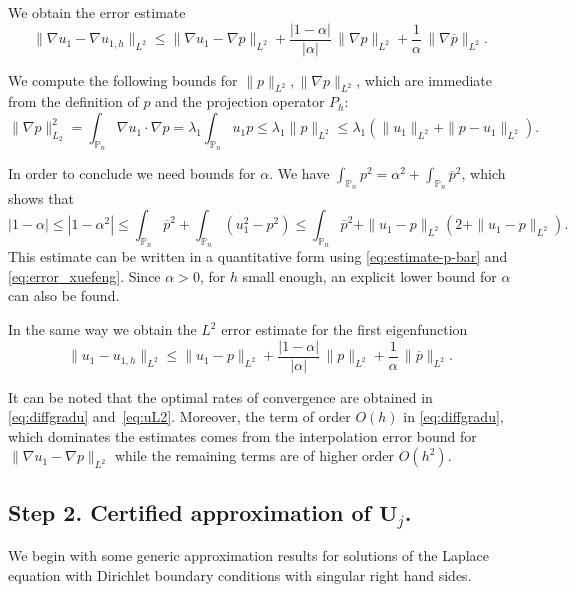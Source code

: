 \documentclass[11pt]{article}
\numberwithin{equation}{section}\newtheorem*{jepEnonce}{\jepEnonceTitle}\newenvironment{enonce*}[1]{\def\jepEnonceTitle{#1}\jepEnonce}{\endjepEnonce}\newtheorem*{conj*}{Conjecture}
\theoremstyle{plain}
\theoremstyle{definition}
\newcommand{\bo}[1]{{\boldsymbol#1}}
\def\Pp{{\mathbb{P}_n}}
\begin{document}
We obtain the error estimate
\begin{equation}
\|\nabla u_1- \nabla u_{1,h}\|_{L^2} \le \|\nabla u_1-\nabla p\|_{L^2} + \frac{|1-\alpha|}{|\alpha |}\, \|\nabla p\|_{L^2} + \frac{1}{\alpha }\, \|\nabla \overline p \|_{L^2}.
\label{eq:diffgradu}
\end{equation}

We compute the following bounds for $\|p\|_{L^2}, \|\nabla p\|_{L^2}$, which are immediate from the definition of $p$ and the projection operator $P_h$:
\[
\| \nabla p\|_{L_2}^2 = \int_\Pp \nabla u_1 \cdot \nabla p = \lambda_1 \int_\Pp u_1p \leq \lambda_1 \|p\|_{L^2}\leq \lambda_1 (\|u_1\|_{L^2}+\|p-u_1\|_{L^2}).
\]

In order to conclude we need bounds for $\alpha$. We have $\int_\Pp p^2=\alpha^2 + \int_\Pp \overline p^2$, which shows that
\[
|1-\alpha| \leq |1-\alpha^2| \leq \int_\Pp \overline p^2 +\int_\Pp (u_1^2-p^2) \leq \int_\Pp \overline p^2 + \|u_1-p\|_{L^2}(2+\|u_1-p\|_{L^2}).
\]
This estimate can be written in a quantitative form using \eqref{eq:estimate-p-bar} and \eqref{eq:error_xuefeng}. Since $\alpha>0$, for $h$ small enough, an explicit lower bound for $\alpha$ can also be found.

In the same way we obtain the $L^2$ error estimate for the first eigenfunction
\begin{equation}
\|u_1-u_{1,h}\|_{L^2} \leq \|u_1-p\|_{L^2}+\frac{|1-\alpha|}{|\alpha|}\, \|p\|_{L^2}+\frac{1}{\alpha}\, \|\overline p\|_{L^2}.
\label{eq:uL2}
\end{equation}

It can be noted that the optimal rates of convergence are obtained in \eqref{eq:diffgradu} and~\eqref{eq:uL2}. Moreover, the term of order $O(h)$ in \eqref{eq:diffgradu}, which dominates the estimates comes from the interpolation error bound for $\|\nabla u_1-\nabla p\|_{L^2}$ while the remaining terms are of higher order $O(h^2)$.

\subsection{Step 2. Certified approximation of $\bo U_j$.}
\label{sec:estimates-U}
We begin with some generic approx\-imation results for solutions of the Laplace equation with Dirichlet boundary conditions with singular right hand sides.
\end{document}
